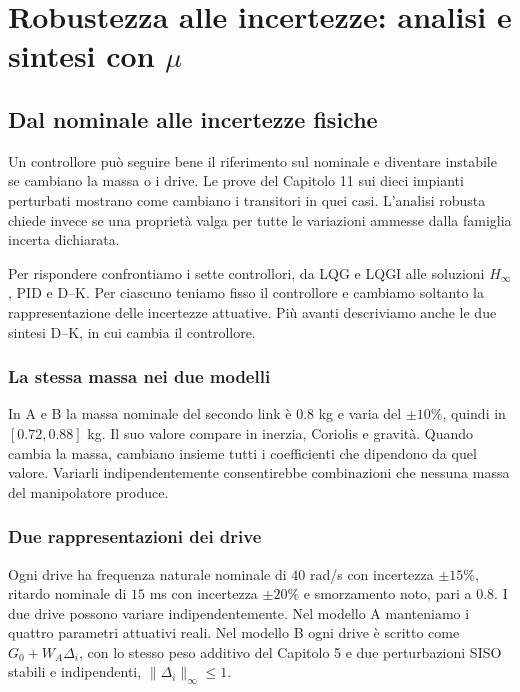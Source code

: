 \chapter{\texorpdfstring{Robustezza alle incertezze: analisi e sintesi con $\mu$}{Robustezza alle incertezze: analisi e sintesi con mu}}
\label{cap:mu}

\section{Dal nominale alle incertezze fisiche}

Un controllore può seguire bene il riferimento sul nominale e diventare
instabile se cambiano la massa o i drive. Le prove del Capitolo 11 sui
dieci impianti perturbati mostrano come cambiano i transitori in quei
casi. L'analisi robusta chiede invece se una proprietà valga per tutte
le variazioni ammesse dalla famiglia incerta dichiarata.

Per rispondere confrontiamo i sette controllori, da LQG e LQGI alle
soluzioni $H_\infty$, PID e D--K. Per ciascuno teniamo fisso il controllore
e cambiamo soltanto la rappresentazione delle incertezze attuative.
Più avanti descriviamo anche le due sintesi D--K, in cui cambia il
controllore.

\subsection{La stessa massa nei due modelli}

In A e B la massa nominale del secondo link è $0.8$ kg e varia del
$\pm10\%$, quindi in $[0.72,0.88]$ kg. Il suo valore compare in inerzia,
Coriolis e gravità. Quando cambia la massa, cambiano insieme tutti i
coefficienti che dipendono da quel valore. Variarli indipendentemente
consentirebbe combinazioni che nessuna massa del manipolatore produce.

\subsection{Due rappresentazioni dei drive}

Ogni drive ha frequenza naturale nominale di $40$ rad/s con incertezza
$\pm15\%$, ritardo nominale di $15$ ms con incertezza $\pm20\%$ e
smorzamento noto, pari a $0.8$. I due drive possono variare
indipendentemente. Nel modello A manteniamo i quattro parametri
attuativi reali. Nel modello B ogni drive è scritto come
$G_0+W_A\Delta_i$, con lo stesso peso additivo del Capitolo 5 e due
perturbazioni SISO stabili e indipendenti, $\|\Delta_i\|_\infty\leq1$.

